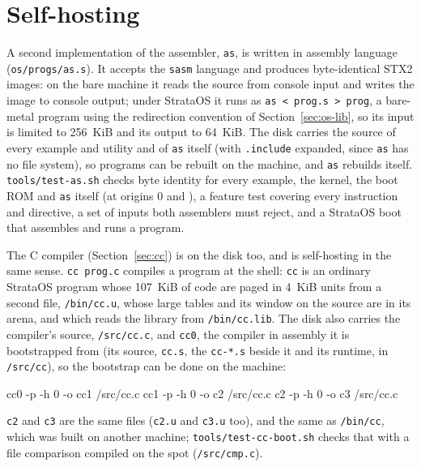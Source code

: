 \section{Self-hosting}\label{sec:os-as}

A second implementation of the assembler, \texttt{as}, is written in \IS assembly language
(\texttt{os/progs/as.s}). It accepts the \texttt{sasm} language and produces byte-identical STX2 images:
on the bare machine it reads the source from console input and writes the image to console output;
under StrataOS it runs as \texttt{as < prog.s > prog}, a bare-metal program using the redirection
convention of Section~\ref{sec:os-lib}, so its input is limited to 256~KiB and its output to 64~KiB. The
disk carries the source of every example and utility and of \texttt{as} itself (with \texttt{.include}
expanded, since \texttt{as} has no file system), so programs can be rebuilt on the machine, and
\texttt{as} rebuilds itself. \texttt{tools/test-as.sh} checks byte identity for every example, the
kernel, the boot ROM and \texttt{as} itself (at origins 0 and ), a feature test covering every
instruction and directive, a set of inputs both assemblers must reject, and a StrataOS boot that
assembles and runs a program.

The C compiler (Section~\ref{sec:cc}) is on the disk too, and is self-hosting in the same sense.
\texttt{cc prog.c} compiles a program at the shell: \texttt{cc} is an ordinary StrataOS program whose
107~KiB of code are paged in 4~KiB units from a second file, \texttt{/bin/cc.u}, whose large tables and
its window on the source are in its arena, and which reads the library from \texttt{/bin/cc.lib}. The
disk also carries the compiler's source, \texttt{/src/cc.c}, and \texttt{cc0}, the compiler in assembly
it is bootstrapped from (its source, \texttt{cc.s}, the \texttt{cc-*.s} beside it and its runtime, in
\texttt{/src/cc}), so the bootstrap can be done on the machine:

\begin{shell}
cc0 -p -h 0 -o cc1 /src/cc.c
cc1 -p -h 0 -o c2 /src/cc.c
c2 -p -h 0 -o c3 /src/cc.c
\end{shell}

\texttt{c2} and \texttt{c3} are the same files (\texttt{c2.u} and \texttt{c3.u} too), and the same as
\texttt{/bin/cc}, which was built on another machine; \texttt{tools/test-cc-boot.sh} checks that with a
file comparison compiled on the spot (\texttt{/src/cmp.c}).
